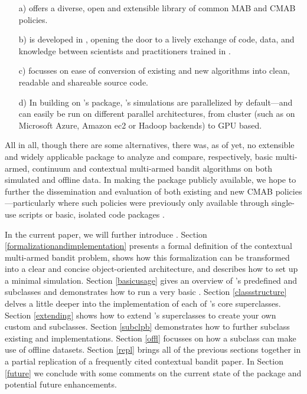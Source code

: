 \documentclass{jss}
\begin{document}
\begin{enumerate}
          \item[a)] offers a diverse, open and extensible library of common MAB and CMAB policies.
          \item[b)] is developed in , opening the door to a lively exchange of code, data, and knowledge between scientists and practitioners trained in .
          \item[c)] focusses on ease of conversion of existing and new algorithms into clean, readable and shareable source code.
          \item[d)]In building on 's  package, 's simulations are parallelized by default---and can easily be run on different parallel architectures, from cluster (such as on Microsoft Azure, Amazon ec2 or Hadoop backends) to GPU based.
\end{enumerate}

All in all, though there are some alternatives, there was, as of yet, no extensible and widely applicable  package to analyze and compare, respectively, basic multi-armed, continuum \citep{Agrawal1995} and contextual multi-armed bandit algorithms on both simulated and offline data. In making the package publicly available, we hope to further the dissemination and evaluation of both existing and new CMAB policies---particularly where such policies were previously only available through single-use scripts or basic, isolated code packages \citep{Gandrud2016}.

In the current paper, we will further introduce . Section \ref{formalizationandimplementation} presents a formal definition of the contextual multi-armed bandit problem, shows how this formalization can be transformed into a clear and concise object-oriented architecture, and describes how to set up a minimal simulation. Section \ref{basicusage} gives an overview of 's predefined  and  subclasses and demonstrates how to run a very basic . Section \ref{classstructure} delves a little deeper into the implementation of each of 's core superclasses. Section \ref{extending} shows how to extend 's superclasses to create your own custom  and  subclasses. Section \ref{subclpb} demonstrates how to further subclass existing  and  implementations. Section \ref{offl} focusses on how a  subclass can make use of offline datasets. Section \ref{repl} brings all of the previous sections together in a partial replication of a frequently cited contextual bandit paper. In Section \ref{future} we conclude with some comments on the current state of the package and potential future enhancements.
\end{document}
